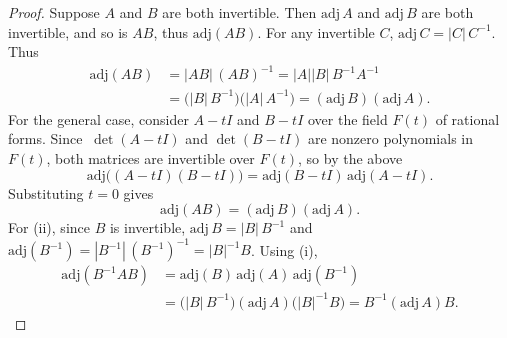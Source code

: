 \begin{proof}
    Suppose $A$ and $B$ are both invertible.
    Then $\text{adj}\, A$ and $\text{adj}\, B$ are both invertible, and so is $AB$, thus $\text{adj}(AB)$.
    For any invertible $C$, $\text{adj}\, C = |C|\, C^{-1}$. Thus
    \begin{align*}
        \text{adj}(AB) &= |AB|\,(AB)^{-1} = |A||B|\, B^{-1}A^{-1} \\
            &= \big(|B|\, B^{-1}\big)\big(|A|\, A^{-1}\big) = (\text{adj}\, B)(\text{adj}\, A).
    \end{align*}
    For the general case, consider $A - tI$ and $B - tI$ over the field $F(t)$ of rational forms.
    Since $\ \det(A - tI)$ and $\det(B - tI)$ are nonzero polynomials in $F(t)$, both matrices are invertible over $F(t)$, so by the above
    \[
        \text{adj}\big((A - tI)(B - tI)\big) = \text{adj}(B - tI)\,\text{adj}(A - tI).
    \]
    Substituting $t = 0$ gives
    \[
        \text{adj}(AB) = (\text{adj}\, B)(\text{adj}\, A).
    \]
    For (ii), since $B$ is invertible, $\text{adj}\, B = |B|\, B^{-1}$ and 
    $\text{adj}(B^{-1}) = |B^{-1}|\,(B^{-1})^{-1} = |B|^{-1} B$. Using (i),
    \begin{align*}
        \text{adj}(B^{-1}AB) &= \text{adj}(B)\,\text{adj}(A)\,\text{adj}(B^{-1}) \\
            &= \big(|B|\, B^{-1}\big)(\text{adj}\, A)\big(|B|^{-1} B\big) = B^{-1}(\text{adj}\, A)B.
    \end{align*}
\end{proof}